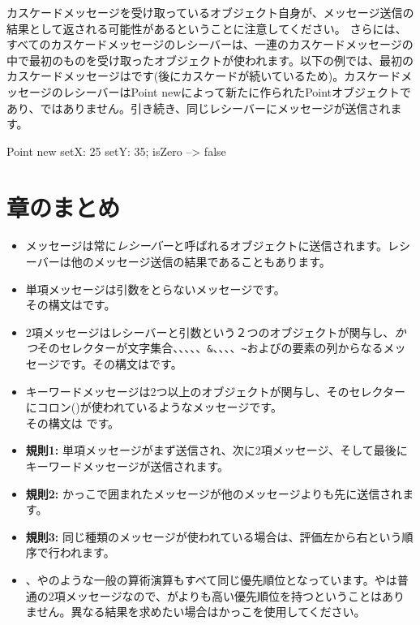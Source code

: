 \documentclass[a4paper,10pt,twoside]{book}
\begin{document}
カスケードメッセージを受け取っているオブジェクト自身が、メッセージ送信の結果として返される可能性があるということに注意してください。
さらには、すべてのカスケードメッセージのレシーバーは、一連のカスケードメッセージの中で最初のものを受け取ったオブジェクトが使われます。以下の例では、最初のカスケードメッセージはです(後にカスケードが続いているため)。カスケードメッセージのレシーバーは{\ct Point new}によって新たに作られたPointオブジェクトであり、ではありません。引き続き、同じレシーバーにメッセージが送信されます。

\begin{code}{}
Point new setX: 25 setY: 35; isZero --> false
\end{code}

\section{章のまとめ}

\begin{itemize}
\item メッセージは常に\emph{レシーバー}と呼ばれるオブジェクトに送信されます。レシーバーは他のメッセージ送信の結果であることもあります。

\item 単項メッセージは引数をとらないメッセージです。\\
その構文はです。

\item 2項メッセージはレシーバーと引数という２つのオブジェクトが関与し、\emph{かつ}そのセレクターが文字集合\ct{+}、\ct{-}、\ct{*}、\ct{/}、\ct{|}、\texttt{\&}、\ct{=}、\ct{>}、\ct{<}、\texttt{\~}およびの要素の列からなるメッセージです。その構文はです。

\item キーワードメッセージは2つ以上のオブジェクトが関与し、そのセレクターにコロン(\ct{:})が使われているようなメッセージです。\\
その構文は
です。

\item \textbf{規則1:} 単項メッセージがまず送信され、次に2項メッセージ、そして最後にキーワードメッセージが送信されます。
\item \textbf{規則2:} かっこで囲まれたメッセージが他のメッセージよりも先に送信されます。
\item \textbf{規則3:} 同じ種類のメッセージが使われている場合は、評価左から右という順序で行われます。
\item {}、\ct{+}や\ct{*}のような一般の算術演算もすべて同じ優先順位となっています。\ct{+}や\ct{*}は普通の2項メッセージなので、\ct{*}が\ct{+}よりも高い優先順位を持つということはありません。異なる結果を求めたい場合はかっこを使用してください。
\end{itemize}

\ifx\wholebook\relax\else
\end{document}
